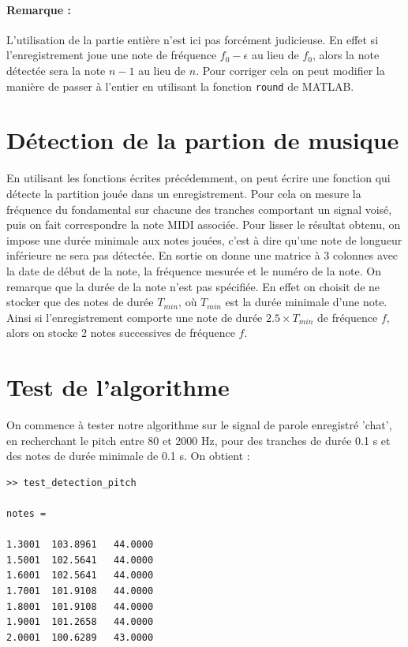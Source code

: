 \documentclass[french]{article}
\begin{document}
\paragraph{Remarque :} L'utilisation de la partie entière n'est ici pas forcément judicieuse. En effet si l'enregistrement joue une note de fréquence $f_0 - \epsilon$ au lieu de $f_0$, alors la note détectée sera la note $n-1$ au lieu de $n$. Pour corriger cela on peut modifier la manière de passer à l'entier en utilisant la fonction \texttt{round} de MATLAB.

\section{Détection de la partion de musique}

En utilisant les fonctions écrites précédemment, on peut écrire une fonction qui détecte la partition jouée dans un enregistrement. Pour cela on mesure la fréquence du fondamental sur chacune des tranches comportant un signal voisé, puis on fait correspondre la note MIDI associée. Pour lisser le résultat obtenu, on impose une durée minimale aux notes jouées, c'est à dire qu'une note de longueur inférieure ne sera pas détectée. En sortie on donne une matrice à 3 colonnes avec la date de début de la note, la fréquence mesurée et le numéro de la note. On remarque que la durée de la note n'est pas spécifiée. En effet on choisit de ne stocker que des notes de durée $T_{min}$, où $T_{min}$ est la durée minimale d'une note. Ainsi si l'enregistrement comporte une note de durée $2.5\times T_{min}$ de fréquence $f$, alors on stocke 2 notes successives de fréquence $f$.

\section{Test de l'algorithme}

On commence à tester notre algorithme sur le signal de parole enregistré 'chat', en recherchant le pitch entre 80 et 2000 Hz, pour des tranches de durée 0.1 s et des notes de durée minimale de 0.1 s. On obtient :

\begin{lstlisting}
>> test_detection_pitch

notes =

1.3001  103.8961   44.0000
1.5001  102.5641   44.0000
1.6001  102.5641   44.0000
1.7001  101.9108   44.0000
1.8001  101.9108   44.0000
1.9001  101.2658   44.0000
2.0001  100.6289   43.0000
\end{lstlisting}
\end{document}
